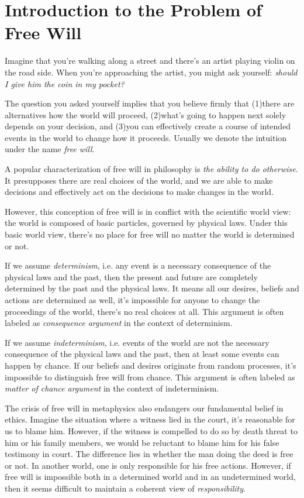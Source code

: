 \section{Introduction to the Problem of Free Will}

Imagine that you're walking along a street and there's an artist playing violin on the road side. When you're approaching the artist, you might ask yourself: \emph{should I give him the coin in my pocket?}

The question you asked yourself implies that you believe firmly that (1)there are alternatives how the world will proceed, (2)what's going to happen next solely depends on your decision, and (3)you can effectively create a course of intended events in the world to change how it proceeds. Usually we denote the intuition under the name \emph{free will}.

A popular characterization of free will in philosophy is \emph{the ability to do otherwise}. It presupposes there are real choices of the world, and we are able to make decisions and effectively act on the decisions to make changes in the world.

However, this conception of free will is in conflict with the scientific world view: the world is composed of basic particles, governed by physical laws. Under this basic world view, there’s no place for free will no matter the world is determined or not.

If we assume \emph{determinism}, i.e. any event is a necessary consequence of the physical laws and the past, then the present and future are completely determined by the past and the physical laws. It means all our desires, beliefs and actions are determined as well, it’s impossible for anyone to change the proceedings of the world, there’s no real choices at all. This argument is often labeled as \emph{consequence argument} in the context of determinism.

If we assume \emph{indeterminism}, i.e. events of the world are not the necessary consequence of the physical laws and the past, then at least some events can happen by chance. If our beliefs and desires originate from random processes, it’s impossible to distinguish free will from chance. This argument is often labeled as \emph{matter of chance argument} in the context of indeterminism.

The crisis of free will in metaphysics also endangers our fundamental belief in ethics. Imagine the situation where a witness lied in the court, it's reasonable for us to blame him. However, if the witness is compelled to do so by death threat to him or his family members, we would be reluctant to blame him for his false testimony in court. The difference lies in whether the man doing the deed is free or not. In another world, one is only responsible for his free actions. However, if free will is impossible both in a determined world and in an undetermined world, then it seems difficult to maintain a coherent view of \emph{responsibility}.

